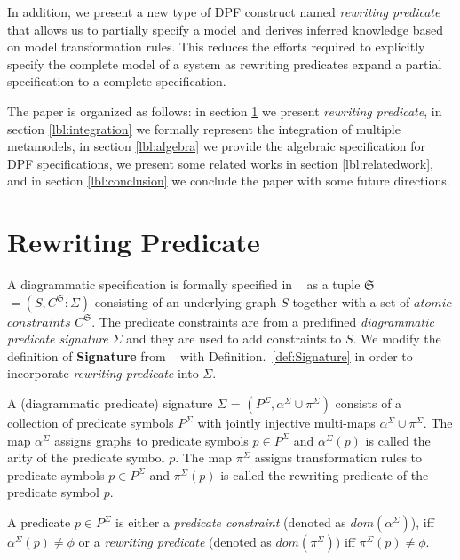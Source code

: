 \documentclass{eceasst}
\begin{document}
In addition, we present a new type of DPF construct named \textit{rewriting predicate} that allows us to partially specify a model and derives inferred knowledge based on model transformation rules. 
This reduces the efforts required to explicitly specify the complete model of a system as rewriting predicates expand a partial specification to a complete specification. 

The paper is organized as follows: in section \ref{lbl:rewritingpredicate} we present \textit{rewriting predicate}, in section \ref{lbl:integration} we formally represent the integration of 
multiple metamodels, in section \ref{lbl:algebra} we provide the algebraic specification for DPF specifications, we present some related works in section \ref{lbl:relatedwork}, and 
in section \ref{lbl:conclusion} we conclude the paper with some future directions. 

\section{Rewriting Predicate}\label{lbl:rewritingpredicate}
A diagrammatic specification is formally specified in ~\cite{Rutle10} as a tuple $\mathfrak{S}$ $= (S, C^\mathfrak{S}:\Sigma)$ consisting of an underlying graph $S$ together with a set of 
$atomic$ $constraints$ $C^\mathfrak{S}$. The predicate constraints are from a predifined \textit{diagrammatic predicate signature} $\Sigma$ and they are used to add constraints to $S$. 
We modify the definition of \textbf{Signature} from ~\cite{Rutle10} with Definition.~\ref{def:Signature} in order to incorporate \textit{rewriting predicate} into $\Sigma$.


\begin{definition}[Signature]\label{def:Signature}
 A (diagrammatic predicate) signature $\Sigma$ = $(P^\Sigma, \alpha^\Sigma \cup \pi^\Sigma)$ consists of a collection of predicate symbols $P^\Sigma$ with jointly injective 
 multi-maps $\alpha^\Sigma \cup \pi^\Sigma$. The map $\alpha^\Sigma$ assigns graphs to predicate symbols $p \in P^\Sigma$ and $\alpha^\Sigma(p)$ is called the arity of the predicate symbol $p$. 
 The map $\pi^\Sigma$ assigns transformation rules to predicate symbols $p \in P^\Sigma$ and $\pi^\Sigma(p)$ is called the rewriting predicate of the predicate symbol $p$. 
\end{definition}

\begin{remark}
A predicate $p \in P^\Sigma$ is either a \textit{predicate constraint} (denoted as $dom(\alpha^\Sigma)$), iff $\alpha^\Sigma(p) \neq \phi$ 
or a \textit{rewriting predicate} (denoted as $dom(\pi^\Sigma)$) iff $\pi^\Sigma(p) \neq \phi$. 
\end{remark}
\end{document}
